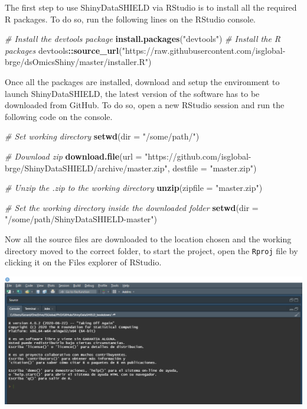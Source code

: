 \documentclass[
]{book}
\newenvironment{Shaded}{\begin{snugshade}}{\end{snugshade}}
\newcommand{\CommentTok}[1]{\textcolor[rgb]{0.56,0.35,0.01}{\textit{#1}}}
\newcommand{\DataTypeTok}[1]{\textcolor[rgb]{0.13,0.29,0.53}{#1}}
\newcommand{\KeywordTok}[1]{\textcolor[rgb]{0.13,0.29,0.53}{\textbf{#1}}}
\newcommand{\NormalTok}[1]{#1}
\newcommand{\OperatorTok}[1]{\textcolor[rgb]{0.81,0.36,0.00}{\textbf{#1}}}
\newcommand{\StringTok}[1]{\textcolor[rgb]{0.31,0.60,0.02}{#1}}
\begin{document}
The first step to use ShinyDataSHIELD via RStudio is to install all the required R packages. To do so, run the following lines on the RStudio console.

\begin{Shaded}
\begin{Highlighting}[]
\CommentTok{# Install the devtools package}
\KeywordTok{install.packages}\NormalTok{(}\StringTok{"devtools"}\NormalTok{)}
\CommentTok{# Install the R packages}
\NormalTok{devtools}\OperatorTok{::}\KeywordTok{source_url}\NormalTok{(}\StringTok{"https://raw.githubusercontent.com/isglobal-brge/dsOmicsShiny/master/installer.R"}\NormalTok{)}
\end{Highlighting}
\end{Shaded}

Once all the packages are installed, download and setup the environment to launch ShinyDataSHIELD, the latest version of the software has to be downloaded from GitHub. To do so, open a new RStudio session and run the following code on the console.

\begin{Shaded}
\begin{Highlighting}[]
  \CommentTok{# Set working directory}
\KeywordTok{setwd}\NormalTok{(}\DataTypeTok{dir =} \StringTok{"/some/path/"}\NormalTok{)}

  \CommentTok{# Download zip}
\KeywordTok{download.file}\NormalTok{(}\DataTypeTok{url =} \StringTok{"https://github.com/isglobal-brge/ShinyDataSHIELD/archive/master.zip"}\NormalTok{, }\DataTypeTok{destfile =} \StringTok{"master.zip"}\NormalTok{)}

  \CommentTok{# Unzip the .zip to the working directory}
\KeywordTok{unzip}\NormalTok{(}\DataTypeTok{zipfile =} \StringTok{"master.zip"}\NormalTok{)}

  \CommentTok{# Set the working directory inside the downloaded folder}
\KeywordTok{setwd}\NormalTok{(}\DataTypeTok{dir =} \StringTok{"/some/path/ShinyDataSHIELD-master"}\NormalTok{)}
\end{Highlighting}
\end{Shaded}

Now all the source files are downloaded to the location chosen and the working directory moved to the correct folder, to start the project, open the \texttt{Rproj} file by clicking it on the Files explorer of RStudio.

\includegraphics{images/setup1.png}
\end{document}
